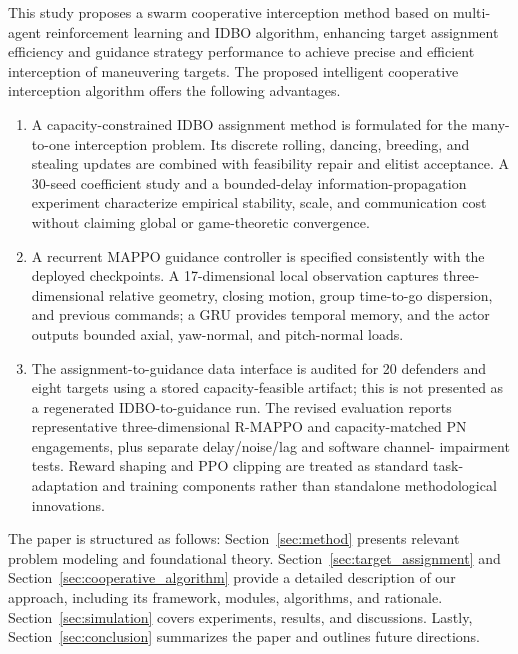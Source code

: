 \documentclass[lettersize,journal]{IEEEtran}
\begin{document}
This study proposes a swarm cooperative interception method based on multi-agent reinforcement
learning and IDBO algorithm, enhancing target assignment efficiency and guidance strategy
performance to achieve precise and efficient interception of maneuvering targets.
The proposed intelligent cooperative interception algorithm offers the following advantages.

{\color{blue}
\begin{enumerate}
\item A capacity-constrained IDBO assignment method is formulated for the many-to-one
interception problem. Its discrete rolling, dancing, breeding, and stealing updates are
combined with feasibility repair and elitist acceptance. A 30-seed coefficient study and a
bounded-delay information-propagation experiment characterize empirical stability, scale, and
communication cost without claiming global or game-theoretic convergence.

\item A recurrent MAPPO guidance controller is specified consistently with the deployed
checkpoints. A 17-dimensional local observation captures three-dimensional relative geometry,
closing motion, group time-to-go dispersion, and previous commands; a GRU provides temporal
memory, and the actor outputs bounded axial, yaw-normal, and pitch-normal loads.

\item The assignment-to-guidance data interface is audited for 20 defenders and eight
targets using a stored capacity-feasible artifact; this is not presented as a regenerated
IDBO-to-guidance run. The revised evaluation reports representative three-dimensional R-MAPPO and
capacity-matched PN engagements, plus separate delay/noise/lag and software channel-
impairment tests. Reward shaping and PPO clipping are treated as standard task-adaptation and
training components rather than standalone methodological innovations.
\end{enumerate}
}

The paper is structured as follows: Section~\ref{sec:method} presents relevant problem modeling and foundational theory. Section~\ref{sec:target_assignment} and Section~\ref{sec:cooperative_algorithm} provide a detailed description of our approach, including its framework, modules, algorithms, and rationale. Section~\ref{sec:simulation} covers experiments, results, and discussions. Lastly, Section~\ref{sec:conclusion} summarizes the paper and outlines future directions.
\end{document}
